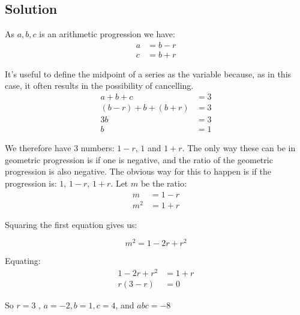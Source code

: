 \documentclass{book}
\begin{document}
\subsection{Solution}

As \(a,b,c\) is an arithmetic progression we have:
\begin{align*}
  a&=b-r\\
  c&=b+r
\end{align*}

It's useful to define the midpoint of a series as the variable because, as in this case, it often results in the possibility of cancelling.
\begin{align*}
  a+b+c&=3\\
  (b-r)+b+(b+r)&=3\\
  3b&=3\\
  b&=1
\end{align*}

We therefore have 3 numbers: \(1-r\), \(1\) and \(1+r\). The only way these can be in geometric progression is if one is negative, and the ratio of the geometric progression is also negative. The obvious way for this to happen is if the progression is: \(1\), \(1-r\), \(1+r\).
Let \(m\) be the ratio:
\begin{align*}
  m&=1-r\\
  m^2&=1+r
\end{align*}

Squaring the first equation gives us:

\[m^2=1-2r+r^2\]

Equating:
\begin{align*}
  1-2r+r^2&=1+r\\
  r(3-r)&=0
\end{align*}

So \(r=3\) , \(a=-2,b=1,c=4\), and \(\boxed{abc=-8}\)
\newpage
\end{document}

